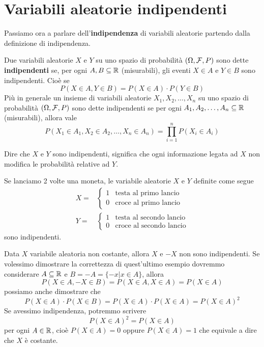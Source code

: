 \section{Variabili aleatorie indipendenti}
Passiamo ora a parlare dell'\textbf{indipendenza} di variabili aleatorie partendo dalla definizione
di indipendenza.

\begin{definition}
	Due variabili aleatorie $X$ e $Y$ su uno spazio di probabilità $(\Omega, \mathcal{F}, P)$ sono dette
	\textbf{indipendenti} se, per ogni $A, B \subseteq \mathbb{R}$ (misurabili), gli eventi $X \in A$ e
	$Y \in B$ sono indipendenti. Cioè se
	\[ P(X \in A, Y \in B) = P(X \in A) \cdot P(Y \in B) \]
	Più in generale un insieme di variabili aleatorie $X_1, X_2, \dots, X_n$ su uno spazio di
	probabilità $(\Omega, \mathcal{F}, P)$ sono dette indipendenti se per ogni
	$A_1, A_2, \dots, A_n \subseteq \mathbb{R}$ (misurabili), allora vale
	\[ P(X_1 \in A_1, X_2 \in A_2, \dots, X_n \in A_n) = \prod_{i=1}^n P(X_i \in A_i) \]
\end{definition}

Dire che $X$ e $Y$ sono indipendenti, significa che ogni informazione legata ad $X$ non modifica
le probabilità relative ad $Y$.

\begin{example}
	Se lanciamo 2 volte una moneta, le variabile aleatorie $X$ e $Y$ definite come segue
	\begin{align*}
		X = & \begin{cases}
			      1 & \text{testa al primo lancio} \\
			      0 & \text{croce al primo lancio}
		      \end{cases}   \\[1ex]
		Y = & \begin{cases}
			      1 & \text{testa al secondo lancio} \\
			      0 & \text{croce al secondo lancio}
		      \end{cases}
	\end{align*}
	sono indipendenti.
\end{example}

\begin{example}
	Data $X$ variabile aleatoria non costante, allora $X$ e $-X$ non sono indipendenti. Se
	volessimo dimostrare la correttezza di quest'ultimo esempio dovremmo considerare
	$A \subseteq \mathbb{R}$ e $B = -A = \{ -x | x \in A \}$, allora
	\[ P(X \in A, -X \in B) = P(X \in A, X \in A) = P(X \in A) \]
	possiamo anche dimostrare che
	\[ P(X \in A) \cdot P(X \in B) = P(X \in A) \cdot P(X \in A) = P(X \in A)^2 \]
	Se avessimo indipendenza, potremmo scrivere
	\[ P(X \in A)^2 = P(X \in A) \]
	per ogni $A \in \mathbb{R}$, cioè $P(X \in A) = 0$ oppure $P(X \in A) = 1$ che equivale a dire che $X$ è
	costante.
\end{example}

